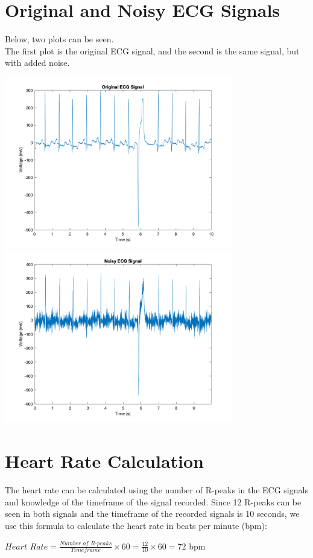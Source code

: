 \documentclass[11pt,oneside]{book}
\begin{document}
\chapter{Original and Noisy ECG Signals}
Below, two plots can be seen. 
\\The first plot is the original ECG signal, and the second is the same signal, but with added noise.
\begin{center}
\includegraphics[width=10cm]{graphics/orig.png}
\includegraphics[width=10cm]{graphics/noisy.png}
\end{center}
\chapter{Heart Rate Calculation}
The heart rate can be calculated using the number of R-peaks in the ECG signals and knowledge of the timeframe of the signal recorded.
Since 12 R-peaks can be seen in both signals and the timeframe of the recorded signals is 10 seconds, we use this formula to calculate the heart rate in beats per minute (bpm):
\begin{center}
    $\textit{Heart Rate} = \frac{\textit{Number of R-peaks}}{\textit{Timeframe}} \times 60 = \frac{12}{10} \times 60 = 72$ bpm
\end{center}
\end{document}
